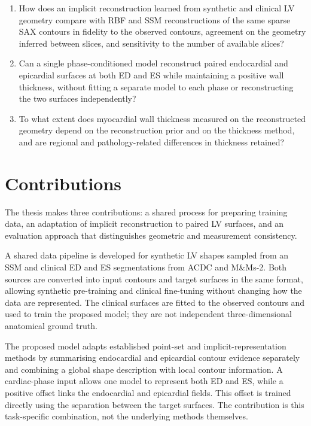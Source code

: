 \begin{enumerate}[label=\textbf{RQ\arabic*.}]
\item How does an implicit reconstruction learned from synthetic and clinical
LV geometry compare with RBF and SSM reconstructions of the same sparse SAX
contours in fidelity to the observed contours, agreement on the geometry
inferred between slices, and sensitivity to the number of available slices?

\item Can a single phase-conditioned model reconstruct paired endocardial and
epicardial surfaces at both ED and ES while maintaining a positive wall
thickness, without fitting a separate model to each phase or reconstructing
the two surfaces independently?

\item To what extent does myocardial wall thickness measured on the
reconstructed geometry depend on the reconstruction prior and on the
thickness method, and are regional and pathology-related differences in
thickness retained?
\end{enumerate}

\section{Contributions}
\label{sec:introduction-contributions}
\noindent
The thesis makes three contributions: a shared process for preparing training
data, an adaptation of implicit reconstruction to paired LV surfaces, and an
evaluation approach that distinguishes geometric and measurement consistency.

A shared data pipeline is developed for synthetic LV shapes sampled from an
SSM and clinical ED and ES segmentations from ACDC
and M\&Ms-2. Both sources are converted into input contours and target
surfaces in the same format, allowing synthetic pre-training and clinical
fine-tuning without changing how the data are represented. The clinical
surfaces are fitted to the observed contours and used to train the proposed model;
they are not independent three-dimensional anatomical ground truth.

The proposed model adapts established point-set and implicit-representation methods by
summarising endocardial and epicardial contour evidence separately and
combining a global shape description with local contour information. A
cardiac-phase input allows one model to represent both ED and ES, while a
positive offset links the endocardial and epicardial fields. This offset is
trained directly using the separation between the target surfaces. The
contribution is this task-specific combination, not the underlying methods
themselves.

